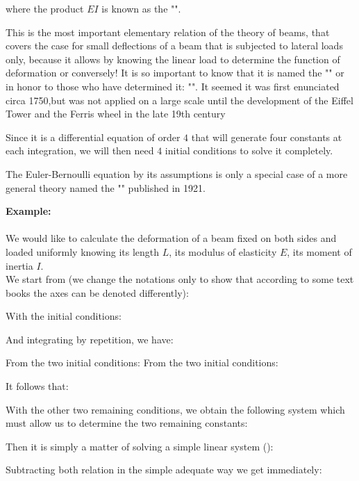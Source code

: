 	where the product $EI$ is known as the "".
	
	This is the most important elementary relation of the theory of beams, that covers the case for small deflections of a beam that is subjected to lateral loads only, because it allows by knowing the linear load to determine the function of deformation or conversely! It is so important to know that it is named the "" or in honor to those who have determined it: "".  It seemed it was first enunciated circa 1750,but was not applied on a large scale until the development of the Eiffel Tower and the Ferris wheel in the late 19th century

	Since it is a differential equation of order $4$ that will generate four constants at each integration, we will then need $4$ initial conditions to solve it completely.
	\begin{tcolorbox}[title=Remark,colframe=black,arc=10pt]
	The Euler-Bernoulli equation by its assumptions is only a special case of a more general theory named the "" published in 1921.
	\end{tcolorbox}
	
	\begin{tcolorbox}[colframe=black,colback=white,sharp corners]
	\textbf{{\Large {}}Example:}\\\\
	We would like to calculate the deformation of a beam fixed on both sides and loaded uniformly knowing its length $L$, its modulus of elasticity $E$, its moment of inertia $I$. \\

	We start from (we change the notations only to show that according to some text books the axes can be denoted differently):
	
	With the initial conditions:
	
	And integrating by repetition, we have:
	
	From the two initial conditions:
	From the two initial conditions:
	
	It follows that:
	
	With the other two remaining conditions, we obtain the following system which must allow us to determine the two remaining constants:
	
	Then it is simply a matter of solving a simple linear system ():
	
	Subtracting both relation in the simple adequate way we get immediately:
	\end{tcolorbox}
	
